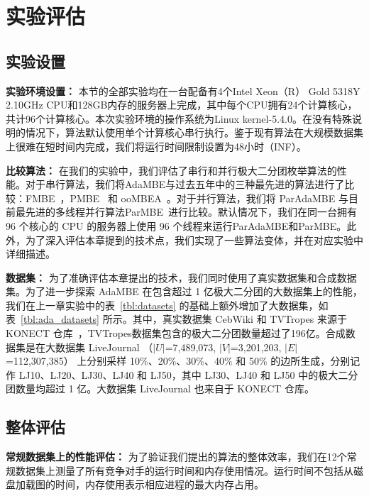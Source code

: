 \section{实验评估}

\subsection{实验设置}

\textbf{实验环境设置：} 本节的全部实验均在一台配备有4个Intel Xeon（R） Gold 5318Y 2.10GHz CPU和128GB内存的服务器上完成，其中每个CPU拥有24个计算核心，共计96个计算核心。本次实验环境的操作系统为Linux kernel-5.4.0。在没有特殊说明的情况下，算法默认使用单个计算核心串行执行。鉴于现有算法在大规模数据集上很难在短时间内完成，我们将运行时间限制设置为48小时（INF）。

\textbf{比较算法：} 在我们的实验中，我们评估了串行和并行极大二分团枚举算法的性能。对于串行算法，我们将AdaMBE与过去五年中的三种最先进的算法进行了比较：FMBE~\cite{parMBE19}，PMBE~\cite{PMBE20} 和 ooMBEA~\cite{ooMBE22}。对于并行算法，我们将 ParAdaMBE 与目前最先进的多线程并行算法ParMBE~\cite{parMBE19}进行比较。默认情况下，我们在同一台拥有 96 个核心的 CPU 的服务器上使用 96 个线程来运行ParAdaMBE和ParMBE。此外，为了深入评估本章提到的技术点，我们实现了一些算法变体，并在对应实验中详细描述。




\textbf{数据集：} 为了准确评估本章提出的技术，我们同时使用了真实数据集和合成数据集。为了进一步探索 AdaMBE 在包含超过 1 亿极大二分团的大数据集上的性能，我们在上一章实验中的表~\ref{tbl:datasets} 的基础上额外增加了大数据集，如表~\ref{tbl:ada_datasets} 所示。其中，真实数据集 CebWiki 和 TVTropes 来源于 KONECT 仓库~\cite{konect}，TVTropes数据集包含的极大二分团数量超过了196亿。合成数据集是在大数据集 LiveJournal （$|U|$=7,489,073, $|V|$=3,201,203, $|E|$=112,307,385） 上分别采样 10\%、20\%、30\%、40\% 和 50\% 的边所生成，分别记作 LJ10、LJ20、LJ30、LJ40 和 LJ50，其中 LJ30、LJ40 和 LJ50 中的极大二分团数量均超过 1 亿。大数据集 LiveJournal 也来自于 KONECT 仓库。

\subsection{整体评估}
\label{subsec:ada_overall}

\textbf{常规数据集上的性能评估：} 为了验证我们提出的算法的整体效率，我们在12个常规数据集上测量了所有竞争对手的运行时间和内存使用情况。运行时间不包括从磁盘加载图的时间，内存使用表示相应进程的最大内存占用。


